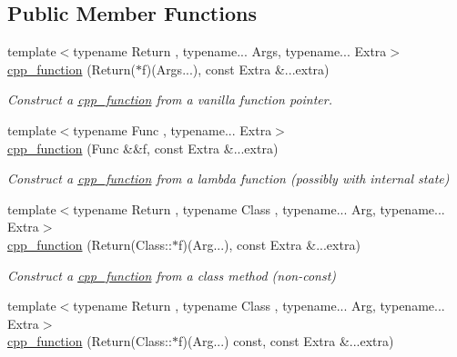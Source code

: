 \subsection*{Public Member Functions}
\begin{DoxyCompactItemize}
\item 
{\footnotesize template$<$typename Return , typename... Args, typename... Extra$>$ }\\\hyperlink{classcpp__function_aff4d851172ead4abf0c86098eb7218b9}{cpp\+\_\+function} (Return($\ast$f)(Args...), const Extra \&...extra)\hypertarget{classcpp__function_aff4d851172ead4abf0c86098eb7218b9}{}\label{classcpp__function_aff4d851172ead4abf0c86098eb7218b9}

\begin{DoxyCompactList}\small\item\em Construct a \hyperlink{classcpp__function}{cpp\+\_\+function} from a vanilla function pointer. \end{DoxyCompactList}\item 
{\footnotesize template$<$typename Func , typename... Extra$>$ }\\\hyperlink{classcpp__function_a5e819bb569420e532e9d2363576f6048}{cpp\+\_\+function} (Func \&\&f, const Extra \&...extra)\hypertarget{classcpp__function_a5e819bb569420e532e9d2363576f6048}{}\label{classcpp__function_a5e819bb569420e532e9d2363576f6048}

\begin{DoxyCompactList}\small\item\em Construct a \hyperlink{classcpp__function}{cpp\+\_\+function} from a lambda function (possibly with internal state) \end{DoxyCompactList}\item 
{\footnotesize template$<$typename Return , typename Class , typename... Arg, typename... Extra$>$ }\\\hyperlink{classcpp__function_ae2b01fc8ed09db9c8286539419dd668b}{cpp\+\_\+function} (Return(Class\+::$\ast$f)(Arg...), const Extra \&...extra)\hypertarget{classcpp__function_ae2b01fc8ed09db9c8286539419dd668b}{}\label{classcpp__function_ae2b01fc8ed09db9c8286539419dd668b}

\begin{DoxyCompactList}\small\item\em Construct a \hyperlink{classcpp__function}{cpp\+\_\+function} from a class method (non-\/const) \end{DoxyCompactList}\item 
{\footnotesize template$<$typename Return , typename Class , typename... Arg, typename... Extra$>$ }\\\hyperlink{classcpp__function_a20d536c635230780980e9fd494f5f342}{cpp\+\_\+function} (Return(Class\+::$\ast$f)(Arg...) const, const Extra \&...extra)\hypertarget{classcpp__function_a20d536c635230780980e9fd494f5f342}{}\label{classcpp__function_a20d536c635230780980e9fd494f5f342}


\end{DoxyCompactItemize}
